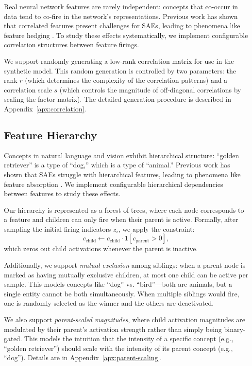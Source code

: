 \documentclass{article}
\theoremstyle{plain}
\theoremstyle{definition}
\theoremstyle{remark}
\begin{document}
Real neural network features are rarely independent: concepts that co-occur in data tend to co-fire in the network's representations. Previous work has shown that correlated features present challenges for SAEs, leading to phenomena like feature hedging \citep{chanin2025feature,chanin2025sparse}. To study these effects systematically, we implement configurable correlation structures between feature firings.

We support randomly generating a low-rank correlation matrix for use in the synthetic model. This random generation is controlled by two parameters: the rank $r$ (which determines the complexity of the correlation patterns) and a correlation scale $s$ (which controls the magnitude of off-diagonal correlations by scaling the factor matrix). The detailed generation procedure is described in Appendix~\ref{apx:correlation}.

\subsection{Feature Hierarchy}
\label{sec:hierarchy}

Concepts in natural language and vision exhibit hierarchical structure: ``golden retriever'' is a type of ``dog,'' which is a type of ``animal.'' Previous work has shown that SAEs struggle with hierarchical features, leading to phenomena like feature absorption \citep{chanin2025a}. We implement configurable hierarchical dependencies between features to study these effects.

Our hierarchy is represented as a forest of trees, where each node corresponds to a feature and children can only fire when their parent is active. Formally, after sampling the initial firing indicators $z_i$, we apply the constraint:
\begin{equation}
c_{\text{child}} \leftarrow c_{\text{child}} \cdot \mathbf{1}[c_{\text{parent}} > 0],
\end{equation}
which zeros out child activations whenever the parent is inactive.

Additionally, we support \emph{mutual exclusion} among siblings: when a parent node is marked as having mutually exclusive children, at most one child can be active per sample. This models concepts like ``dog'' vs. ``bird''---both are animals, but a single entity cannot be both simultaneously. When multiple siblings would fire, one is randomly selected as the winner and the others are deactivated.

We also support \emph{parent-scaled magnitudes}, where child activation magnitudes are modulated by their parent's activation strength rather than simply being binary-gated. This models the intuition that the intensity of a specific concept (e.g., ``golden retriever'') should scale with the intensity of its parent concept (e.g., ``dog''). Details are in Appendix~\ref{apx:parent-scaling}.
\end{document}
